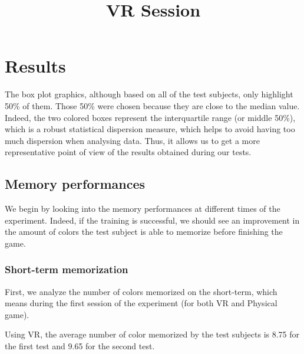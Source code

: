 \documentclass[12pt, openany, twocolumn]{article}
\begin{document}
\section{Results}
    
   
The box plot graphics, although based on all of the test subjects, only highlight 50\% of them. Those 50\% were chosen because they are close to the median value. 
Indeed, the two colored boxes represent the interquartile range (or middle 50\%), which is a robust statistical dispersion measure, which helps to avoid having too much dispersion when analysing data. Thus, it allows us to get a more representative point of view of the results obtained during our tests. 
\\

    \subsection{Memory performances}
    We begin by looking into the memory performances at different times of the experiment.
    Indeed, if the training is successful, we should see an improvement in the amount of colors the test subject is able to memorize before finishing the game.
    \\

        \subsubsection{Short-term memorization}
        First, we analyze the number of colors memorized on the short-term, which means during the first session of the experiment (for both VR and Physical game).
        \\
     
            \noindent \title{\textbf{VR Session}} \vspace{0.25cm}

            Using VR, the average number of color memorized by the test subjects is 8.75 for the first test and 9.65 for the second test.
\end{document}

